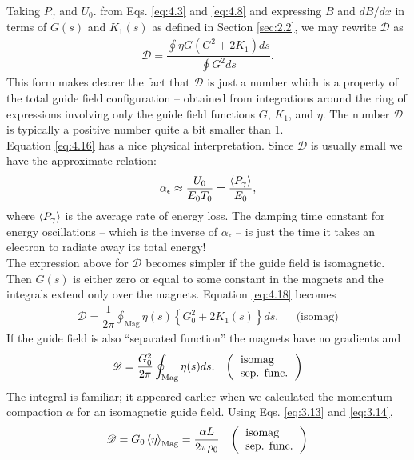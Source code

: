 Taking $P_\gamma$ and $U_0$. from Eqs. \eqref{eq:4.3} and \eqref{eq:4.8} and expressing
 $B$ and $dB/dx$ in terms of $G(s)$ and $K_1(s)$ as defined in Section \ref{sec:2.2}, we may rewrite $\mathscr{D}$ as
\begin{align} \label{eq:4.18}
	\mathscr{D} = \dfrac{\oint \eta G (G^2 + 2K_1)ds}{\oint G^2 ds}.
\end{align}
This form makes clearer the fact that $\mathscr{D}$ is just a number which is a property of
the total guide field configuration -- obtained from integrations around the ring of expressions
 involving only the guide field functions $G$, $K_1$, and $\eta$. The number $\mathscr{D}$ is typically a positive number quite a bit smaller than 1.\\
Equation \eqref{eq:4.16} has a nice physical interpretation. Since $\mathscr{D}$ is usually small
we have the approximate relation:
\begin{align}
	\alpha_\epsilon \approx \dfrac{U_0}{E_0 T_0} = \dfrac{\left< P_\gamma \right>}{E_0},
\end{align}
where $\left< P_\gamma \right>$ is the average rate of energy loss. The damping time constant for energy oscillations -- which is the inverse of $\alpha_\epsilon$ -- is just the time it takes an electron to radiate away its total energy!\\
The expression above for $\mathscr{D}$ becomes simpler if the guide field is isomagnetic. Then $G(s)$ is either zero or equal to some constant in the magnets and the integrals extend only over the magnets. Equation \eqref{eq:4.18} becomes
\begin{align} \label{eq:4.20}
	\mathscr{D} = \dfrac{1}{2\pi}\oint_{\text{Mag}}\eta(s)\left\lbrace G_0^2 + 2K_1(s) \right\rbrace ds. && \text{(isomag)}
\end{align}
If the guide field is also ``separated function'' the magnets have no gradients and
\begin{align}\label{eq:4.17}
	\mathscr{D} = \dfrac{G_0^2}{2\pi}\oint_{\text{Mag}}\eta(s) ds. && \left(\begin{tabular}{l}
\text{isomag} \\
\text{sep. func.}
\end{tabular}\right)
\end{align}
The integral is familiar; it appeared earlier when we calculated the momentum compaction $\alpha$ for an isomagnetic guide field. Using Eqs. \eqref{eq:3.13} and \eqref{eq:3.14},
\begin{align}
	\mathscr{D} = G_0 \mean{\eta}_\text{Mag} = \dfrac{\alpha L}{2 \pi \rho_0} && \left(\begin{tabular}{l}
\text{isomag} \\
\text{sep. func.}
\end{tabular}\right)
\end{align}
